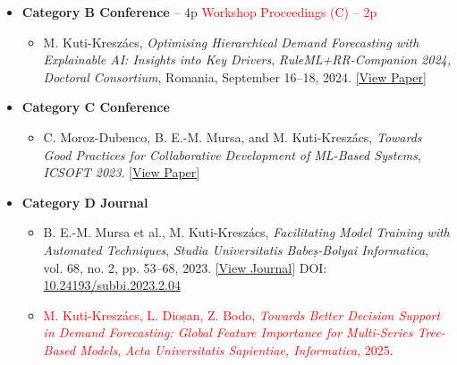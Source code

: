



\begin{itemize}
    \item \textbf{Category B Conference} – 4p \textcolor{red}{Workshop Proceedings (C) – 2p} %
    \begin{itemize}
        \item M. Kuti-Kreszács, \emph{Optimising Hierarchical Demand Forecasting with Explainable AI: Insights into Key Drivers},
        \textit{RuleML+RR-Companion 2024, Doctoral Consortium}, Romania, September 16–18, 2024. \href{https://ceur-ws.org/Vol-3816/paper77.pdf}{[View Paper]}
    \end{itemize}

    \vspace{5pt} %

    \item \textbf{Category C Conference}
    \begin{itemize}
        \item C. Moroz-Dubenco, B. E.-M. Mursa, and M. Kuti-Kreszács,
        \emph{Towards Good Practices for Collaborative Development of ML-Based Systems},
        \textit{ICSOFT 2023}. \href{https://www.scitepress.org/Papers/2023/121305/121305.pdf}{[View Paper]}
    \end{itemize}

    \vspace{5pt}

    \item \textbf{Category D Journal}
    \begin{itemize}
        \item B. E.-M. Mursa et al., M. Kuti-Kreszács,
        \emph{Facilitating Model Training with Automated Techniques},
        \textit{Studia Universitatis Babeș-Bolyai Informatica}, vol. 68, no. 2, pp. 53–68, 2023.
        \newline \href{https://www.cs.ubbcluj.ro/~studia-i/journal/journal/article/view/93}{[View Journal]}
        \newline DOI: \href{https://doi.org/10.24193/subbi.2023.2.04}{10.24193/subbi.2023.2.04}

        \vspace{5pt}

        \item \textcolor{red}{M. Kuti-Kreszács, L. Dioșan, Z. Bodo,
        \emph{Towards Better Decision Support in Demand Forecasting: Global Feature Importance for Multi-Series Tree-Based Models},
        \textit{Acta Universitatis Sapientiae, Informatica}, 2025.}
    \end{itemize}
\end{itemize}